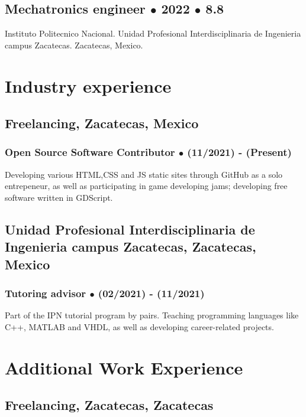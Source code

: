 \documentclass{article}
\begin{document}
  \subsection{Mechatronics engineer $\bullet$ 2022 $\bullet$ 8.8}
  Instituto Politecnico Nacional.
  Unidad Profesional Interdisciplinaria de Ingenieria campus Zacatecas.
  Zacatecas, Mexico.


  \section{Industry experience}

  \subsection{\textbf{Freelancing}, Zacatecas, Mexico}

  \subsubsection{Open Source Software Contributor $\bullet$ (11/2021) - (Present)}

  Developing various HTML,CSS and JS static sites through GitHub as a solo entrepeneur, as well as participating in game developing jams; developing free software written in GDScript.

  \subsection{Unidad Profesional Interdisciplinaria de Ingenieria campus Zacatecas, Zacatecas, Mexico}

  \subsubsection{Tutoring advisor $\bullet$ (02/2021) - (11/2021)}

  Part of the IPN tutorial program by pairs. Teaching programming languages like C++, MATLAB and VHDL, as well as developing career-related projects.


  \section{Additional Work Experience}

  \subsection{\textbf{Freelancing}, Zacatecas, Zacatecas}
\end{document}
